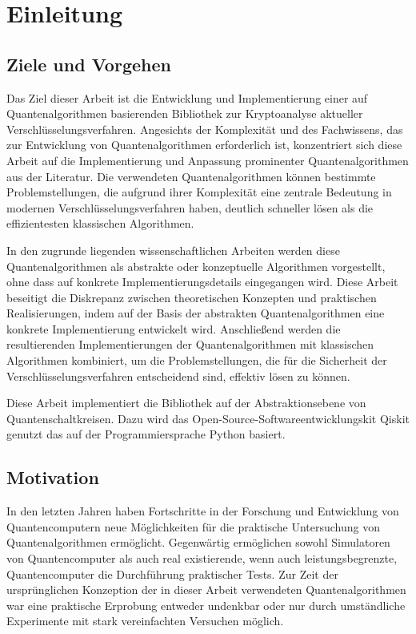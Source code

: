 \section{Einleitung}

\subsection{Ziele und Vorgehen}




Das Ziel dieser Arbeit ist die Entwicklung und Implementierung einer auf Quantenalgorithmen basierenden Bibliothek zur Kryptoanalyse aktueller Verschlüsselungsverfahren. 
Angesichts der Komplexität und des Fachwissens, das zur Entwicklung von Quantenalgorithmen erforderlich ist, 
konzentriert sich diese Arbeit auf die Implementierung und Anpassung prominenter Quantenalgorithmen aus der Literatur.
Die verwendeten Quantenalgorithmen können bestimmte Problemstellungen, 
die aufgrund ihrer Komplexität eine zentrale Bedeutung in modernen Verschlüsselungsverfahren haben, 
deutlich schneller lösen als die effizientesten klassischen Algorithmen.

In den zugrunde liegenden wissenschaftlichen Arbeiten werden diese Quantenalgorithmen als abstrakte oder konzeptuelle Algorithmen vorgestellt, 
ohne dass auf konkrete Implementierungsdetails eingegangen wird. 
Diese Arbeit beseitigt die Diskrepanz zwischen theoretischen Konzepten und praktischen Realisierungen, 
indem auf der Basis der abstrakten Quantenalgorithmen eine konkrete Implementierung entwickelt wird.
Anschließend werden die resultierenden Implementierungen der Quantenalgorithmen mit klassischen Algorithmen kombiniert, 
um die Problemstellungen, die für die Sicherheit der Verschlüsselungsverfahren entscheidend sind, effektiv lösen zu können. 

Diese Arbeit implementiert die Bibliothek auf der Abstraktionsebene von Quantenschaltkreisen.
Dazu wird das Open-Source-Softwareentwicklungskit Qiskit genutzt das auf der Programmiersprache Python basiert.

\subsection{Motivation}
In den letzten Jahren haben Fortschritte in der Forschung und Entwicklung von Quantencomputern neue Möglichkeiten für die praktische Untersuchung von Quantenalgorithmen ermöglicht.
Gegenwärtig ermöglichen sowohl Simulatoren von Quantencomputer als auch real existierende, wenn auch leistungsbegrenzte, Quantencomputer die Durchführung praktischer Tests.
Zur Zeit der ursprünglichen Konzeption der in dieser Arbeit verwendeten Quantenalgorithmen war eine praktische Erprobung entweder undenkbar oder nur durch umständliche Experimente mit stark vereinfachten Versuchen möglich.


